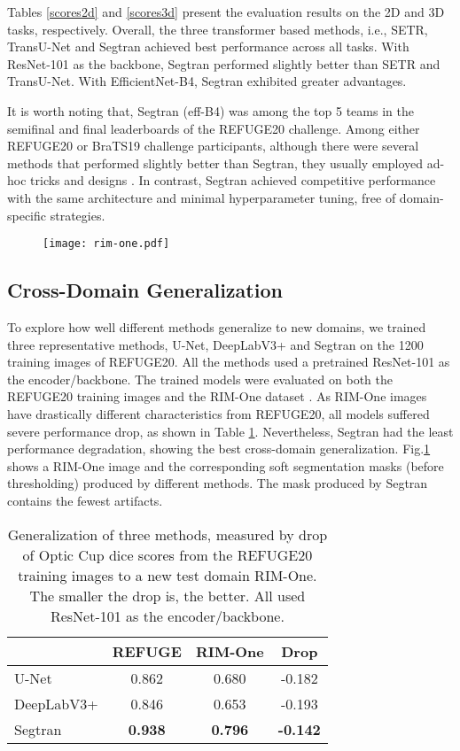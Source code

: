 \documentclass{article}
\begin{document}
Tables \ref{scores2d} and \ref{scores3d} present the evaluation results on the 2D and 3D tasks, respectively. Overall, the three transformer based methods, i.e., SETR, TransU-Net and Segtran achieved best performance across all tasks. With ResNet-101 as the backbone, Segtran performed slightly better than SETR and TransU-Net. With EfficientNet-B4, Segtran exhibited greater advantages.

It is worth noting that, Segtran (eff-B4) was among the top 5 teams in the semifinal and final leaderboards of the REFUGE20 challenge. Among either REFUGE20 or BraTS19 challenge participants, although there were several methods that performed slightly better than Segtran, they usually employed ad-hoc tricks and designs \cite{refuge,nnu-net-ext,bag-tricks}. In contrast, Segtran achieved competitive performance 
with the same architecture and minimal hyperparameter tuning, free of domain-specific strategies.

\begin{figure}[h]
\centering
  \texttt{[image: rim-one.pdf]}
  \label{fig:rim-one}
\end{figure}

\subsection{Cross-Domain Generalization}
To explore how well different methods generalize to new domains, we trained three representative methods, U-Net, DeepLabV3+ and Segtran on the 1200 training images of REFUGE20. All the methods used a pretrained ResNet-101 as the encoder/backbone. The trained models were evaluated on both the REFUGE20 training images and the RIM-One dataset \cite{rim-one}. As RIM-One images have drastically different characteristics from REFUGE20, all models suffered severe performance drop, as shown in Table \ref{generalization}. Nevertheless, Segtran had the least performance degradation, showing the best cross-domain generalization. Fig.\ref{fig:rim-one} shows a RIM-One image and the corresponding soft segmentation masks (before thresholding) produced by different methods. The mask produced by Segtran contains the fewest artifacts.

\begin{table}[h]
\begin{centering}
\begin{tabular}{|l|c|c|c|}
\hline 
 & REFUGE & RIM-One & Drop \tabularnewline
\hline 
U-Net & 0.862 & 0.680 & -0.182 \tabularnewline
\hline 
DeepLabV3+ & 0.846 & 0.653 & -0.193 \tabularnewline
\hline 
Segtran & \textbf{0.938} & \textbf{0.796} & \textbf{-0.142} \tabularnewline
\hline 
\end{tabular}
\caption{Generalization of three methods, measured by drop of Optic Cup dice scores from the REFUGE20 training images to a new test domain RIM-One. The smaller the drop is, the better. All used ResNet-101 as the encoder/backbone.}
\label{generalization}
\par\end{centering}
\end{table}
\end{document}
